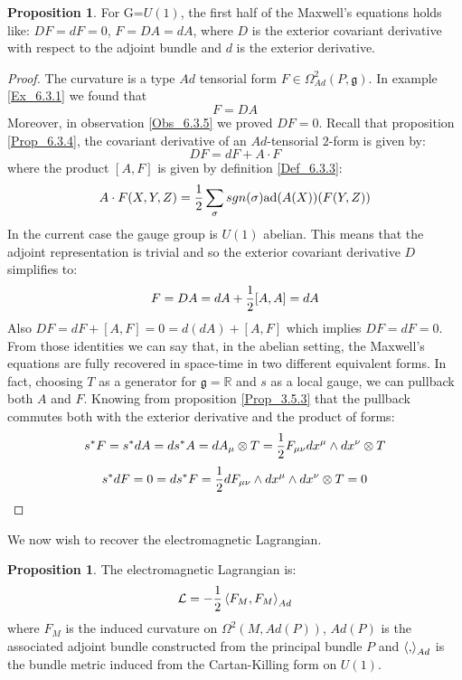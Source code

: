 \documentclass[12pt,a4paper]{report}
\theoremstyle{definition}
\theoremstyle{Theorem}
\newtheorem{Prop}[Def]{Proposition}
\theoremstyle{definition}
\theoremstyle{definition}
\begin{document}
	\begin{Prop}\label{Prop_8.4.3}
		For G=$U(1)$, the first half of the Maxwell's equations holds like: $DF=dF=0$, $F=DA=dA$, where $D$ is the exterior covariant derivative with respect to the adjoint bundle and $d$ is the exterior derivative.
	\end{Prop}
	\begin{proof}
		The curvature is a type $Ad$ tensorial form $F\in \Omega^2_{Ad}(P,\mathfrak{g})$. In example \ref{Ex_6.3.1} we found that
		$$F=DA$$
		Moreover, in observation \ref{Obs_6.3.5} we proved $DF=0$. Recall that proposition \ref{Prop_6.3.4}, the covariant derivative of an $Ad$-tensorial $2$-form is given by:
		$$DF=dF+A\cdot F$$
		where the product $[A,F]$ is given by definition \ref{Def_6.3.3}:
		$$A\cdot F(X,Y,Z)={1\over 2}\sum_\sigma sgn(\sigma)\hbox{ad}(A(X))(F(Y,Z))$$
		In the current case the gauge group is $U(1)$ abelian. This means that the adjoint representation is trivial and so the exterior covariant derivative $D$ simplifies to:
		$$F=DA=dA+{1\over 2}[A,A]=dA$$
		Also $DF=dF+[A,F]=0=d(dA)+[A,F]$ which implies $DF=dF=0$. From those identities we can say that, in the abelian setting, the Maxwell's equations are fully recovered in space-time in two different equivalent forms. In fact, choosing $T$ as a generator for $\mathfrak{g}=\mathbb{R}$ and $s$ as a local gauge, we can pullback both $A$ and $F$. Knowing from proposition \ref{Prop_3.5.3} that the pullback commutes both with the exterior derivative and the product of forms:
		$$s^*F=s^*dA=ds^*A=dA_\mu\otimes T={1\over 2}F_{\mu\nu} dx^\mu\wedge dx^\nu \otimes T$$
		$$s^*dF=0=ds^*F={1\over 2}dF_{\mu\nu}\wedge dx^\mu\wedge dx^\nu \otimes T=0$$
	\end{proof}
	We now wish to recover the electromagnetic Lagrangian.
	\begin{Prop}
		The electromagnetic Lagrangian is:
		$$\mathcal{L}=-{1\over 2}\braket{F_M,F_M}_{Ad}$$
		where $F_M$ is the induced curvature on $\Omega^2(M,Ad(P))$, $Ad(P)$ is the associated adjoint bundle constructed from the principal bundle $P$ and $\braket{,}_{Ad}$ is the bundle metric induced from the Cartan-Killing form on $U(1)$.
	\end{Prop}
\end{document}
